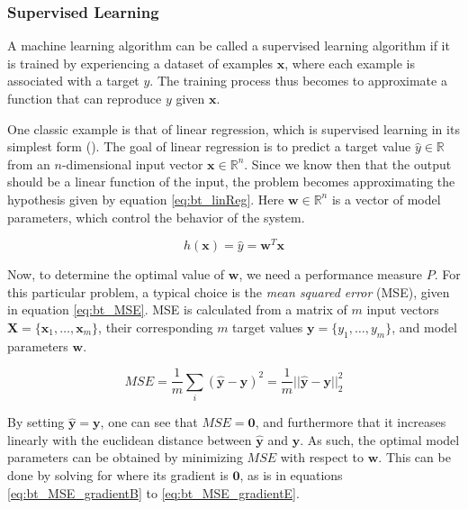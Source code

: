 \subsubsection{Supervised Learning}

A machine learning algorithm can be called a supervised learning algorithm if it is trained by experiencing a dataset of examples $\mathbf{x}$, where each example is associated with a target $y$. The training process thus becomes to approximate a function that can reproduce $y$ given $\mathbf{x}$.

One classic example is that of linear regression, which is supervised learning in its simplest form (\cite{goodfellow2016}). The goal of linear regression is to predict a target value $\hat{y}\in\mathbb{R}$ from an $n$-dimensional input vector $\mathbf{x}\in\mathbb{R}^n$. Since we know then that the output should be a linear function of the input, the problem becomes approximating the hypothesis given by equation \ref{eq:bt_linReg}. Here $\mathbf{w}\in\mathbb{R}^n$ is a vector of model parameters, which control the behavior of the system.

\begin{equation}
    \label{eq:bt_linReg}
    h(\mathbf{x})=\hat{y}=\mathbf{w}^T\mathbf{x}
\end{equation}

Now, to determine the optimal value of $\mathbf{w}$, we need a performance measure $P$. For this particular problem, a typical choice is the \textit{mean squared error} (MSE), given in equation \ref{eq:bt_MSE}. MSE is calculated from a matrix of $m$ input vectors $\mathbf{X}=\{\mathbf{x}_1,\dots,\mathbf{x}_m\}$, their corresponding $m$ target values $\mathbf{y}=\{y_1,\dots,y_m\}$, and model parameters $\mathbf{w}$.

\begin{equation}
    \label{eq:bt_MSE}
    MSE=\frac{1}{m}\sum_{i}(\hat{\mathbf{y}}-\mathbf{y})^2
    =\frac{1}{m}||\hat{\mathbf{y}}-\mathbf{y}||^2_2
\end{equation}

By setting $\hat{\mathbf{y}}=\mathbf{y}$, one can see that $MSE=\mathbf{0}$, and furthermore that it increases linearly with the euclidean distance between $\hat{\mathbf{y}}$ and $\mathbf{y}$. As such, the optimal model parameters can be obtained by minimizing $MSE$ with respect to $\mathbf{w}$. This can be done by solving for where its gradient is $\mathbf{0}$, as is in equations \ref{eq:bt_MSE_gradientB} to \ref{eq:bt_MSE_gradientE}.

